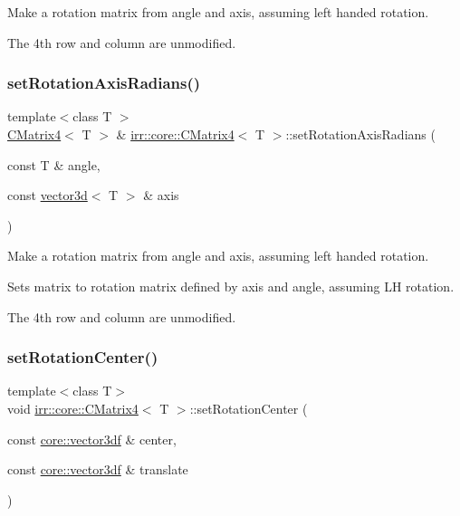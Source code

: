 Make a rotation matrix from angle and axis, assuming left handed rotation. 

The 4th row and column are unmodified. \mbox{\label{classirr_1_1core_1_1CMatrix4_a2fad61540e78fc7dafe7f6270b0558ac}} 
\subsubsection{\texorpdfstring{set\+Rotation\+Axis\+Radians()}{setRotationAxisRadians()}\hspace{0.1cm}{\footnotesize\ttfamily [2/2]}}
{\footnotesize\ttfamily template$<$class T $>$ \\
\hyperlink{classirr_1_1core_1_1CMatrix4}{C\+Matrix4}$<$ T $>$ \& \hyperlink{classirr_1_1core_1_1CMatrix4}{irr\+::core\+::\+C\+Matrix4}$<$ T $>$\+::set\+Rotation\+Axis\+Radians (\begin{DoxyParamCaption}\item[{const T \&}]{angle,  }\item[{const \hyperlink{classirr_1_1core_1_1vector3d}{vector3d}$<$ T $>$ \&}]{axis }\end{DoxyParamCaption})\hspace{0.3cm}{\ttfamily [inline]}}



Make a rotation matrix from angle and axis, assuming left handed rotation. 

Sets matrix to rotation matrix defined by axis and angle, assuming LH rotation.

The 4th row and column are unmodified. \mbox{\label{classirr_1_1core_1_1CMatrix4_a8117628146ce654b3b292af7c49e25e2}} 
\subsubsection{\texorpdfstring{set\+Rotation\+Center()}{setRotationCenter()}\hspace{0.1cm}{\footnotesize\ttfamily [1/2]}}
{\footnotesize\ttfamily template$<$class T$>$ \\
void \hyperlink{classirr_1_1core_1_1CMatrix4}{irr\+::core\+::\+C\+Matrix4}$<$ T $>$\+::set\+Rotation\+Center (\begin{DoxyParamCaption}\item[{const \hyperlink{namespaceirr_1_1core_ae6e2b2a6c552833ebbd5b7463d03586b}{core\+::vector3df} \&}]{center,  }\item[{const \hyperlink{namespaceirr_1_1core_ae6e2b2a6c552833ebbd5b7463d03586b}{core\+::vector3df} \&}]{translate }\end{DoxyParamCaption})}



